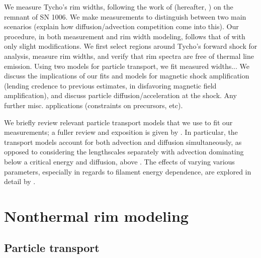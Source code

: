 \documentclass[iop, apj, numberedappendix, twocolappendix]{emulateapj}
\begin{document}
We measure Tycho's rim widths, following the work of \citet{ressler2014}
(hereafter, ) on the remnant of SN 1006.
We make measurements to distinguish between two main scenarios
(explain how diffusion/advection competition come into this).
Our procedure, in both measurement and rim width modeling, follows that of
 with only slight modifications.
We first select regions around Tycho's forward shock for analysis, measure
rim widths, and verify that rim spectra are free of thermal line emission.
Using two models for particle transport, we fit measured widths...
We discuss the implications of our fits and models for magnetic shock
amplification (lending credence to previous estimates, in disfavoring magnetic
field amplification), and discuss particle diffusion/acceleration at the shock.
Any further misc. applications (constraints on precursors, etc).

We briefly review relevant particle transport models that we use to fit our
measurements; a fuller review and exposition is given by .
In particular, the transport models
account for both advection and diffusion simultaneously, as opposed to
considering the lengthscales separately with advection dominating below a
critical energy and diffusion, above
\citep{bamba2003, vink2003, yamazaki2004, bamba2005-hist}
.
The effects of varying various parameters, especially in regards to filament
energy dependence, are explored in detail by .

\section{Nonthermal rim modeling}\label{sec:models}

\subsection{Particle transport}\label{sec:transport}
\end{document}
